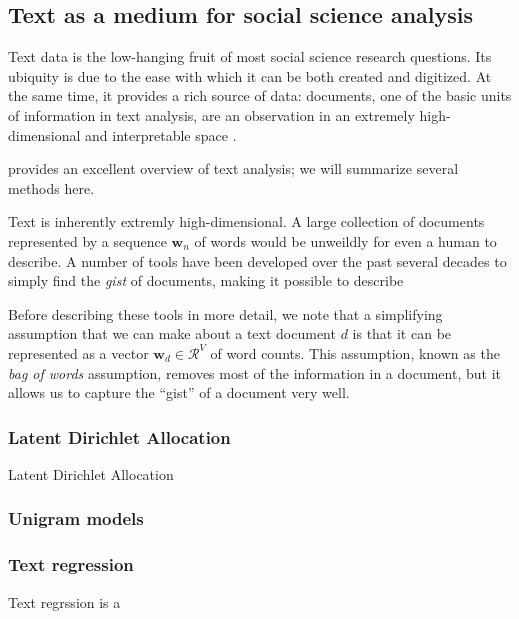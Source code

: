 \subsection{Text as a medium for social science analysis}
  Text data is the low-hanging fruit of most social science research
  questions.  Its ubiquity is due to the ease with which it can be
  both created and digitized.  At the same time, it provides a rich
  source of data: documents, one of the basic units of information in
  text analysis, are an observation in an extremely high-dimensional
  and interpretable space \cite{changrtl:2009}.

  \cite{grimmer:submitted} provides an excellent overview of text
  analysis; we will summarize several methods here.

  
  Text is inherently extremly high-dimensional.  A large collection of
  documents represented by a sequence $\bm w_n$ of words would be
  unweildly for even a human to describe.  A number of tools have been
  developed over the past several decades to simply find the
  \emph{gist} of documents, making it possible to describe

  Before describing these tools in more detail, we note that a
  simplifying assumption that we can make about a text document $d$ is
  that it can be represented as a vector $\bm w_d \in \mathcal{R}^V$
  of word counts.  This assumption, known as the \emph{bag of words}
  assumption, removes most of the information in a document, but it
  allows us to capture the ``gist'' of a document very well.

\subsubsection{Latent Dirichlet Allocation}
  Latent Dirichlet Allocation 

\subsubsection{Unigram models}

\subsubsection{Text regression}
  Text regrssion is a 

